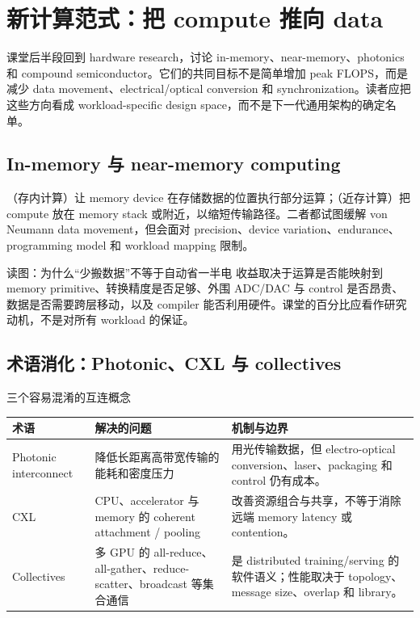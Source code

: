 \section{新计算范式：把 compute 推向 data}

课堂后半段回到 hardware research，讨论 in-memory、near-memory、photonics 和 compound semiconductor。它们的共同目标不是简单增加 peak FLOPS，而是减少 data movement、electrical/optical conversion 和 synchronization。读者应把这些方向看成 workload-specific design space，而不是下一代通用架构的确定名单。

\subsection{In-memory 与 near-memory computing}

（存内计算）让 memory device 在存储数据的位置执行部分运算；（近存计算）把 compute 放在 memory stack 或附近，以缩短传输路径。二者都试图缓解 von Neumann data movement，但会面对 precision、device variation、endurance、programming model 和 workload mapping 限制。


\begin{knowledgebox}{读图：为什么“少搬数据”不等于自动省一半电}
收益取决于运算是否能映射到 memory primitive、转换精度是否足够、外围 ADC/DAC 与 control 是否昂贵、数据是否需要跨层移动，以及 compiler 能否利用硬件。课堂的百分比应看作研究动机，不是对所有 workload 的保证。
\end{knowledgebox}

\subsection{术语消化：Photonic、CXL 与 collectives}

\begin{knowledgebox}{三个容易混淆的互连概念}
\begin{tabularx}{\textwidth}{L{0.19\textwidth}L{0.25\textwidth}X}
\toprule
术语 & 解决的问题 & 机制与边界 \\
\midrule
Photonic interconnect & 降低长距离高带宽传输的能耗和密度压力 & 用光传输数据，但 electro-optical conversion、laser、packaging 和 control 仍有成本。 \\
CXL & CPU、accelerator 与 memory 的 coherent attachment / pooling & 改善资源组合与共享，不等于消除远端 memory latency 或 contention。 \\
Collectives & 多 GPU 的 all-reduce、all-gather、reduce-scatter、broadcast 等集合通信 & 是 distributed training/serving 的软件语义；性能取决于 topology、message size、overlap 和 library。 \\
\bottomrule
\end{tabularx}
\end{knowledgebox}

